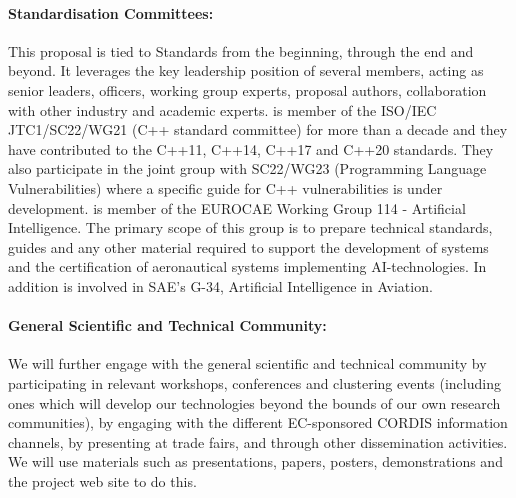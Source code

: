 \documentclass[a4paper,11pt]{article}
\begin{document}
\paragraph{Standardisation Committees:}
This proposal is tied to Standards from the beginning, through the end and beyond. It leverages the key leadership position of several members, acting as senior leaders, officers, working group experts, proposal authors, collaboration with other industry and academic experts.
\UCMshort{} is member of the ISO/IEC JTC1/SC22/WG21 (C++ standard committee) for more than a decade and they have contributed to the C++11, C++14, C++17 and C++20 standards. They also participate in the joint group with SC22/WG23 (Programming Language Vulnerabilities) where a specific guide for C++ vulnerabilities is under development.
\FRQshort{} is member of the EUROCAE Working Group 114 - Artificial Intelligence. The primary scope of this group is to prepare technical standards, guides and any other material required to support the development of systems and the certification of aeronautical systems implementing AI-technologies. In addition \FRQshort{} is involved in SAE's G-34, Artificial Intelligence in Aviation.

%
%

\paragraph{General Scientific and Technical Community:}
We will further engage with the general scientific and technical community
 by participating in relevant workshops, conferences and clustering events (including ones which
 will develop our technologies beyond the bounds of our own research communities), by engaging with the
 different EC-sponsored CORDIS information channels, by presenting at trade
 fairs, and through other dissemination activities.  We will use materials such as presentations,
 papers,  posters, demonstrations and the project web site to do this.
\end{document}
